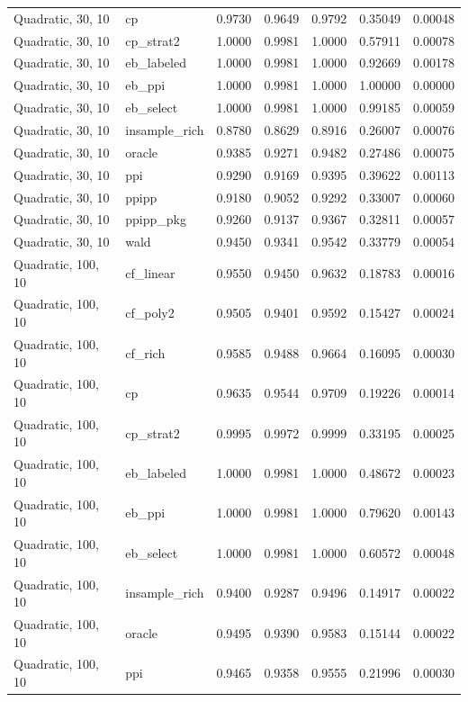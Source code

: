 \begin{longtable}{llrrrrr}
Quadratic, 30, 10 & cp & 0.9730 & 0.9649 & 0.9792 & 0.35049 & 0.00048 \\
Quadratic, 30, 10 & cp\_strat2 & 1.0000 & 0.9981 & 1.0000 & 0.57911 & 0.00078 \\
Quadratic, 30, 10 & eb\_labeled & 1.0000 & 0.9981 & 1.0000 & 0.92669 & 0.00178 \\
Quadratic, 30, 10 & eb\_ppi & 1.0000 & 0.9981 & 1.0000 & 1.00000 & 0.00000 \\
Quadratic, 30, 10 & eb\_select & 1.0000 & 0.9981 & 1.0000 & 0.99185 & 0.00059 \\
Quadratic, 30, 10 & insample\_rich & 0.8780 & 0.8629 & 0.8916 & 0.26007 & 0.00076 \\
Quadratic, 30, 10 & oracle & 0.9385 & 0.9271 & 0.9482 & 0.27486 & 0.00075 \\
Quadratic, 30, 10 & ppi & 0.9290 & 0.9169 & 0.9395 & 0.39622 & 0.00113 \\
Quadratic, 30, 10 & ppipp & 0.9180 & 0.9052 & 0.9292 & 0.33007 & 0.00060 \\
Quadratic, 30, 10 & ppipp\_pkg & 0.9260 & 0.9137 & 0.9367 & 0.32811 & 0.00057 \\
Quadratic, 30, 10 & wald & 0.9450 & 0.9341 & 0.9542 & 0.33779 & 0.00054 \\
Quadratic, 100, 10 & cf\_linear & 0.9550 & 0.9450 & 0.9632 & 0.18783 & 0.00016 \\
Quadratic, 100, 10 & cf\_poly2 & 0.9505 & 0.9401 & 0.9592 & 0.15427 & 0.00024 \\
Quadratic, 100, 10 & cf\_rich & 0.9585 & 0.9488 & 0.9664 & 0.16095 & 0.00030 \\
Quadratic, 100, 10 & cp & 0.9635 & 0.9544 & 0.9709 & 0.19226 & 0.00014 \\
Quadratic, 100, 10 & cp\_strat2 & 0.9995 & 0.9972 & 0.9999 & 0.33195 & 0.00025 \\
Quadratic, 100, 10 & eb\_labeled & 1.0000 & 0.9981 & 1.0000 & 0.48672 & 0.00023 \\
Quadratic, 100, 10 & eb\_ppi & 1.0000 & 0.9981 & 1.0000 & 0.79620 & 0.00143 \\
Quadratic, 100, 10 & eb\_select & 1.0000 & 0.9981 & 1.0000 & 0.60572 & 0.00048 \\
Quadratic, 100, 10 & insample\_rich & 0.9400 & 0.9287 & 0.9496 & 0.14917 & 0.00022 \\
Quadratic, 100, 10 & oracle & 0.9495 & 0.9390 & 0.9583 & 0.15144 & 0.00022 \\
Quadratic, 100, 10 & ppi & 0.9465 & 0.9358 & 0.9555 & 0.21996 & 0.00030 \\

\end{longtable}
